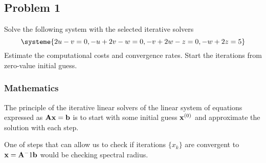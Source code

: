 \subsection{Problem 1}%
\label{sec:problem_1}
Solve the following system with the selected iterative solvers
\begin{equation*}
  \systeme{2u-v=0,-u+2v-w=0,-v+2w-z=0,-w+2z=5}
\end{equation*}
Estimate the computational costs and convergence rates.
Start the iterations from zero-value initial guess.
\subsubsection*{Mathematics}
The principle of the iterative linear solvers of the linear system of equations
expressed as $\mathbf{A}\mathbf{x}=\mathbf{b}$ is to start with some initial guess
$\mathbf{x}^{(0)}$ and approximate the solution with each step.





One of steps that can allow us to check if iterations $\{x_k\}$ are convergent to $\mathbf{x} = \mathbf{A}^-1\mathbf{b}$ would be checking spectral radius.

